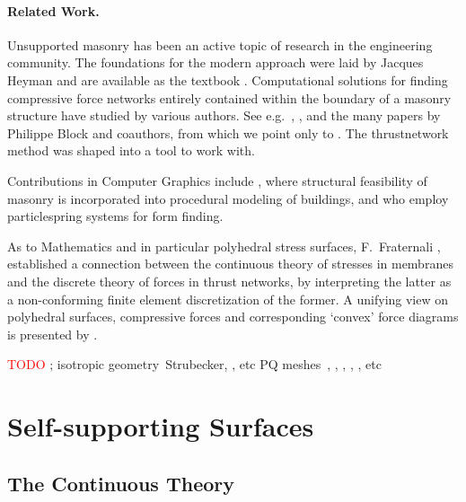\documentclass[annual]{acmsiggraph}
\newcommand{\todo}[1]{\textcolor{red}{#1}}
\begin{document}
\paragraph{Related Work.}

Unsupported masonry has been an active topic of research in the 
engineering community. The foundations for the modern approach were laid 
by Jacques Heyman  and are available as the textbook 
\cite{Heyman95}. Computational solutions for finding compressive force 
networks entirely contained within the boundary of a masonry structure 
have studied by various authors. See e.g.\ \cite{Livesley92}, 
\cite{O'Dwyer98}, and the many papers by Philippe Block and coauthors, 
from which we point only to \cite{Block07}. The thrust\dash network method 
was shaped into a tool to work with. 

\todo{\cite{Block2011}}

Contributions in Computer Graphics include \cite{Whiting09}, where 
structural feasibility of masonry is incorporated into procedural modeling 
of buildings, and \cite{Kilian2005} who employ particle\dash spring 
systems for form finding.

As to Mathematics and in particular polyhedral stress surfaces, 
F.~Fraternali ,  
established a connection between the continuous theory of stresses in 
membranes and the discrete theory of forces in thrust networks, by 
interpreting the latter as a non-conforming finite element discretization 
of the former. A unifying view on polyhedral surfaces, compressive forces 
and corresponding `convex' force diagrams is presented by \cite{Ash1988}.

\todo{TODO} \cite{Giaquinta1985}; isotropic geometry~Strubecker, 
\cite{Koenderink2002}, etc PQ meshes~\cite{Schiftner2010}, 
\cite{Glymph2004}, \cite{Pottmann2007b}, \cite{Mirko2010}, 
\cite{wardetzky07}, etc



\section{Self-supporting Surfaces}

\subsection{The Continuous Theory}
\end{document}
